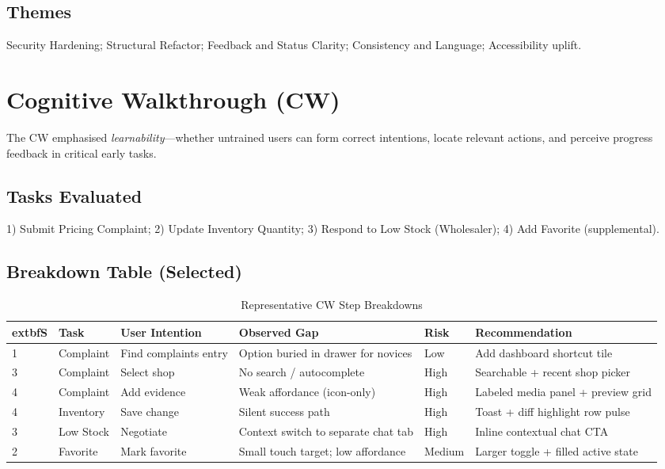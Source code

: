 \documentclass[11pt,a4paper]{article}
\begin{document}
\subsection{Themes}
Security Hardening; Structural Refactor; Feedback and Status Clarity; Consistency and Language; Accessibility uplift.

\section{Cognitive Walkthrough (CW)}
The CW emphasised \emph{learnability}—whether untrained users can form correct intentions, locate relevant actions, and perceive progress feedback in critical early tasks.

\subsection{Tasks Evaluated}
1) Submit Pricing Complaint; 2) Update Inventory Quantity; 3) Respond to Low Stock (Wholesaler); 4) Add Favorite (supplemental).

\subsection{Breakdown Table (Selected)}
\begin{table}[h]
	\centering
	\renewcommand{\arraystretch}{1.12}
	\caption{Representative CW Step Breakdowns}\label{tab:cw-breakdowns}
	\begin{tabular}{|p{0.7cm}|p{1.9cm}|p{2.7cm}|p{5.4cm}|p{1.2cm}|p{3.5cm}|}
		\hline
			extbf{S} & \textbf{Task} & \textbf{User Intention} & \textbf{Observed Gap} & \textbf{Risk} & \textbf{Recommendation} \\
		\hline
		1 & Complaint & Find complaints entry & Option buried in drawer for novices & Low & Add dashboard shortcut tile \\
		\hline
		3 & Complaint & Select shop & No search / autocomplete & High & Searchable + recent shop picker \\
		\hline
		4 & Complaint & Add evidence & Weak affordance (icon-only) & High & Labeled media panel + preview grid \\
		\hline
		4 & Inventory & Save change & Silent success path & High & Toast + diff highlight row pulse \\
		\hline
		3 & Low Stock & Negotiate & Context switch to separate chat tab & High & Inline contextual chat CTA \\
		\hline
		2 & Favorite & Mark favorite & Small touch target; low affordance & Medium & Larger toggle + filled active state \\
		\hline
	\end{tabular}
\end{table}
\end{document}
